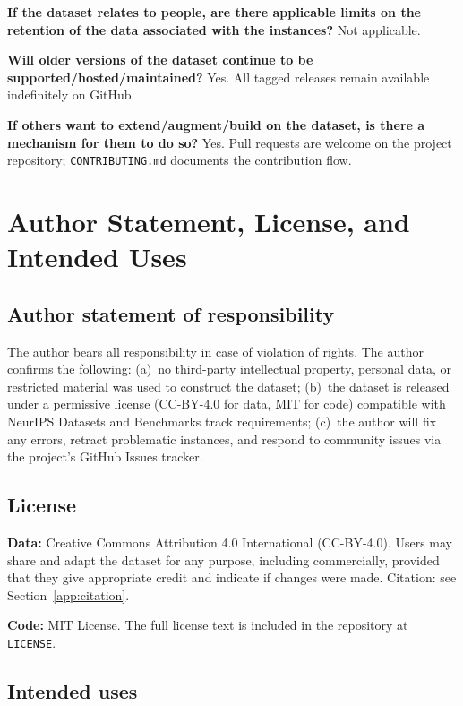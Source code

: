 \documentclass{article}
\begin{document}
\textbf{If the dataset relates to people, are there applicable limits on the retention of the data associated with the instances?}
Not applicable.

\textbf{Will older versions of the dataset continue to be supported/hosted/maintained?}
Yes. All tagged releases remain available indefinitely on GitHub.

\textbf{If others want to extend/augment/build on the dataset, is there a mechanism for them to do so?}
Yes. Pull requests are welcome on the project repository; \texttt{CONTRIBUTING.md} documents the contribution flow.


\section{Author Statement, License, and Intended Uses}
\label{app:author_statement}

\subsection*{Author statement of responsibility}

The author bears all responsibility in case of violation of rights. The author confirms the following:
(a)~no third-party intellectual property, personal data, or restricted material was used to construct the dataset;
(b)~the dataset is released under a permissive license (CC-BY-4.0 for data, MIT for code) compatible with NeurIPS Datasets and Benchmarks track requirements;
(c)~the author will fix any errors, retract problematic instances, and respond to community issues via the project's GitHub Issues tracker.

\subsection*{License}

\textbf{Data:} Creative Commons Attribution 4.0 International (CC-BY-4.0). Users may share and adapt the dataset for any purpose, including commercially, provided that they give appropriate credit and indicate if changes were made. Citation: see Section~\ref{app:citation}.

\textbf{Code:} MIT License. The full license text is included in the repository at \texttt{LICENSE}.

\subsection*{Intended uses}
\end{document}
